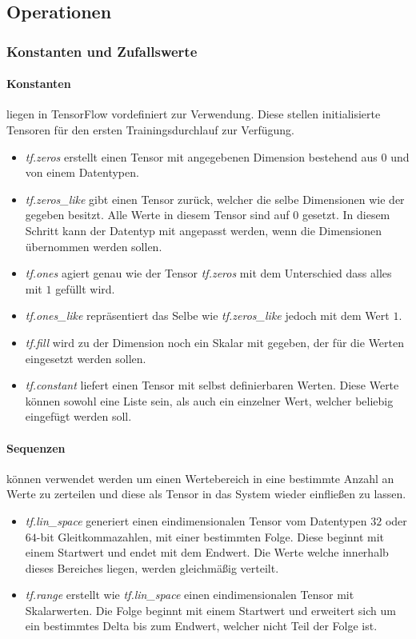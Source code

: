 \subsection{Operationen}

\subsubsection{Konstanten und Zufallswerte}

\paragraph{Konstanten} liegen in TensorFlow vordefiniert zur Verwendung.
Diese stellen initialisierte Tensoren für den ersten Trainingsdurchlauf zur Verfügung.

\begin{itemize}
	\item \textit{tf.zeros} erstellt einen Tensor mit angegebenen Dimension bestehend aus $0$ und von einem Datentypen. 
	\item \textit{tf.zeros\_like} gibt einen Tensor zurück, welcher die selbe Dimensionen wie der gegeben besitzt.
	Alle Werte in diesem Tensor sind auf $0$ gesetzt.
	In diesem Schritt kann der Datentyp mit angepasst werden, wenn die Dimensionen übernommen werden sollen.
	\item \textit{tf.ones} agiert genau wie der Tensor \textit{tf.zeros} mit dem Unterschied dass alles mit $1$ gefüllt wird.
	\item \textit{tf.ones\_like} repräsentiert das Selbe wie \textit{tf.zeros\_like} jedoch mit dem Wert $1$.
	\item \textit{tf.fill} wird zu der Dimension noch ein Skalar mit gegeben, der für die Werten eingesetzt werden sollen.
	\item \textit{tf.constant} liefert einen Tensor mit selbst definierbaren Werten. 
	Diese Werte können sowohl eine Liste sein, als auch ein einzelner Wert, welcher beliebig eingefügt werden soll. 
\end{itemize}

\paragraph{Sequenzen} können verwendet werden um einen Wertebereich in eine bestimmte Anzahl an Werte zu zerteilen und diese als Tensor in das System wieder einfließen zu lassen.

\begin{itemize}
	\item \textit{tf.lin\_space} generiert einen eindimensionalen Tensor vom Datentypen $32$ oder $64$-bit Gleitkommazahlen, mit einer bestimmten Folge.
	Diese beginnt mit einem Startwert und endet mit dem Endwert. 
	Die Werte welche innerhalb dieses Bereiches liegen, werden gleichmäßig verteilt. 
	\item \textit{tf.range} erstellt wie \textit{tf.lin\_space} einen eindimensionalen Tensor mit Skalarwerten. 
	Die Folge beginnt mit einem Startwert und erweitert sich um ein bestimmtes Delta bis zum Endwert, welcher nicht Teil der Folge ist. 
\end{itemize}

